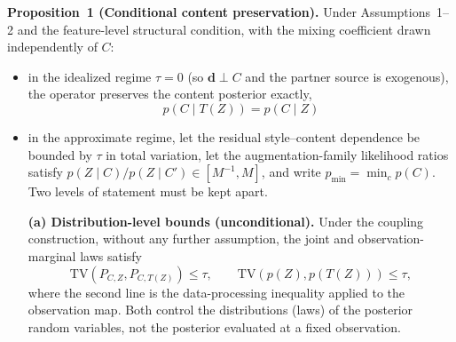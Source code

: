 \documentclass[electronics,article,submit,moreauthors]{Definitions/mdpi}
\begin{document}
\noindent\textbf{Proposition~1 (Conditional content preservation).} Under Assumptions~1--2 and the feature-level structural condition, with the mixing coefficient drawn independently of $C$:
\begin{itemize}[leftmargin=2.7em,labelwidth=2.3em,labelsep=0.4em,align=left]
\item[(L2-i)] in the idealized regime $\tau=0$ (so $\mathbf{d}\perp C$ and the partner source is exogenous), the operator preserves the content posterior exactly,
\begin{equation}
p(C\mid T(Z))=p(C\mid Z)
\end{equation}
\item[(L2-ii)] in the approximate regime, let the residual style--content dependence be bounded by $\tau$ in total variation, let the augmentation-family likelihood ratios satisfy $p(Z\mid C)/p(Z\mid C')\in[M^{-1},M]$, and write $p_{\min}=\min_c p(C)$. Two levels of statement must be kept apart.

\textbf{(a) Distribution-level bounds (unconditional).} Under the coupling construction, without any further assumption, the joint and observation-marginal laws satisfy
\begin{equation}
\mathrm{TV}\!\left(P_{C,Z},P_{C,T(Z)}\right)\le\tau,\qquad
\mathrm{TV}\!\left(p(Z),p(T(Z))\right)\le\tau,
\label{eq:tvbound}
\end{equation}
where the second line is the data-processing inequality applied to the observation map. Both control the distributions (laws) of the posterior random variables, not the posterior evaluated at a fixed observation.


\end{itemize}
\end{document}
